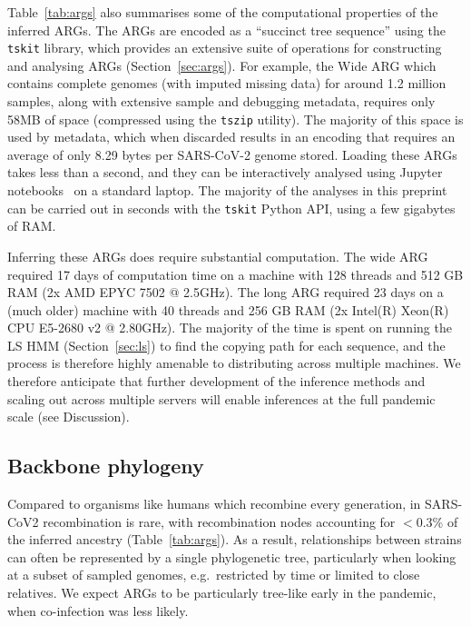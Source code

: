 \documentclass{article}
\begin{document}
Table~\ref{tab:args} also summarises some of the computational
properties of the inferred ARGs.
The ARGs are encoded as a ``succinct tree sequence'' using
the \texttt{tskit} library, which provides an extensive
suite of operations for constructing and analysing ARGs
(Section~\ref{sec:args}). For example, the Wide ARG
which contains complete genomes (with imputed missing data)
for around 1.2 million samples, along with extensive sample
and debugging metadata, requires only 58MB of space (compressed
using the \texttt{tszip} utility). The majority of this
space is used by metadata, which when discarded results in
an encoding that requires an average of only 8.29 bytes per
SARS-CoV-2 genome stored.
Loading these ARGs takes less than a second, and they can be interactively
analysed using Jupyter notebooks~\citep{Kluyver2016-jupyter}
on a standard laptop. The majority
of the analyses in this preprint can be carried out in seconds
with the \texttt{tskit} Python API, using a few gigabytes of RAM.

Inferring these ARGs does require substantial computation.
The wide ARG required 17 days of computation time on a machine with
128 threads and 512 GB RAM (2x AMD EPYC 7502 @ 2.5GHz). The long ARG
required 23 days on a (much older) machine with 40 threads and 256 GB RAM (2x
Intel(R) Xeon(R) CPU E5-2680 v2 @ 2.80GHz). The majority of the time is spent
on running the LS HMM (Section~\ref{sec:ls}) to find the copying
path for each sequence, and the process
is therefore highly amenable to distributing across multiple machines.
We therefore anticipate that further development of the
inference methods and scaling out across multiple servers will
enable inferences at the full pandemic scale
(see Discussion).

\subsection{Backbone phylogeny}
\label{sec:backbone_phylogeny}
Compared to organisms like humans which recombine every generation,
in SARS-CoV2 recombination is rare, with recombination nodes accounting
for $<$0.3\% of the inferred ancestry (Table~\ref{tab:args}). As a result,
relationships between strains can often be represented by a
single phylogenetic tree, particularly when looking at
a subset of sampled genomes, e.g.\ restricted by time or limited to close
relatives. We expect ARGs to be particularly tree-like
early in the pandemic, when co-infection was less likely.
\end{document}

